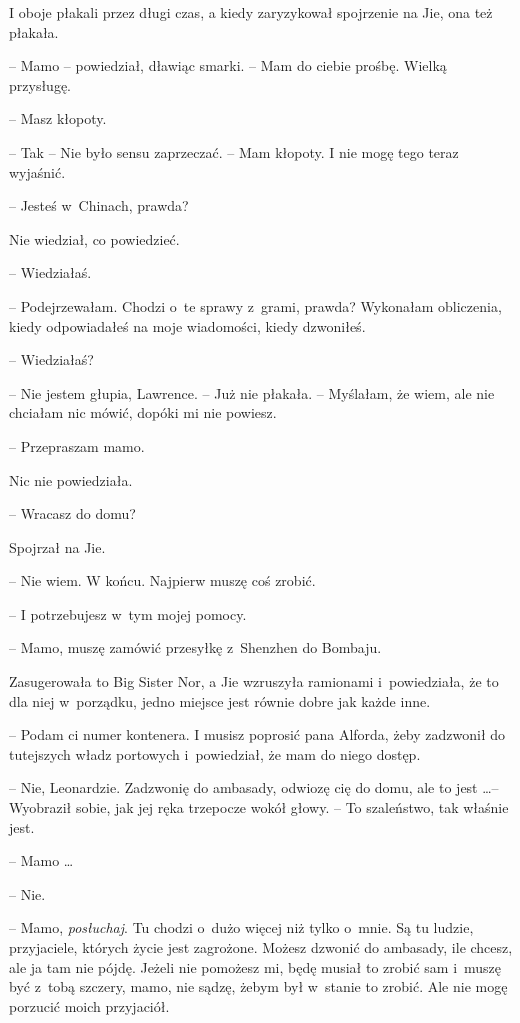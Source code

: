 \documentclass[oneside,polish,11pt,rmheadings]{mwbk}
\begin{document}
I oboje płakali przez długi czas, a kiedy zaryzykował spojrzenie na Jie, ona też płakała.

-- Mamo -- powiedział, dławiąc smarki. -- Mam do ciebie prośbę. Wielką przysługę.

-- Masz kłopoty. 

-- Tak -- Nie było sensu zaprzeczać. -- Mam kłopoty. I nie mogę tego teraz wyjaśnić. 

-- Jesteś w~Chinach, prawda?

Nie wiedział, co powiedzieć.

 -- Wiedziałaś. 

-- Podejrzewałam. Chodzi o~te sprawy z~grami, prawda? Wykonałam obliczenia, kiedy odpowiadałeś na moje wiadomości, kiedy dzwoniłeś.

-- Wiedziałaś? 

-- Nie jestem głupia, Lawrence. -- Już nie płakała. -- Myślałam, że wiem, ale nie chciałam nic mówić, dopóki mi nie powiesz.

-- Przepraszam mamo. 

Nic nie powiedziała.

-- Wracasz do domu?

Spojrzał na Jie.

 -- Nie wiem. W końcu. Najpierw muszę coś zrobić. 

-- I potrzebujesz w~tym mojej pomocy.

-- Mamo, muszę zamówić przesyłkę z~Shenzhen do Bombaju. 

 Zasugerowała to Big Sister Nor, a Jie wzruszyła ramionami i~powiedziała, że to dla niej w~porządku, jedno miejsce jest równie dobre jak każde inne. 
 
 -- Podam ci numer kontenera. I musisz poprosić pana Alforda, żeby zadzwonił do tutejszych władz portowych i~powiedział, że mam do niego dostęp.

-- Nie, Leonardzie. Zadzwonię do ambasady, odwiozę cię do domu, ale to jest \ldots  -- Wyobraził sobie, jak jej ręka trzepocze wokół głowy. -- To szaleństwo, tak właśnie jest.

-- Mamo \ldots 

-- Nie. 

-- Mamo, \textit{posłuchaj}. Tu chodzi o~dużo więcej niż tylko o~mnie. Są tu ludzie, przyjaciele, których życie jest zagrożone. Możesz dzwonić do ambasady, ile chcesz, ale ja tam nie pójdę. Jeżeli nie pomożesz mi, będę musiał to zrobić sam i~muszę być z~tobą szczery, mamo, nie sądzę, żebym był w~stanie to zrobić. Ale nie mogę porzucić moich przyjaciół.
\end{document}
